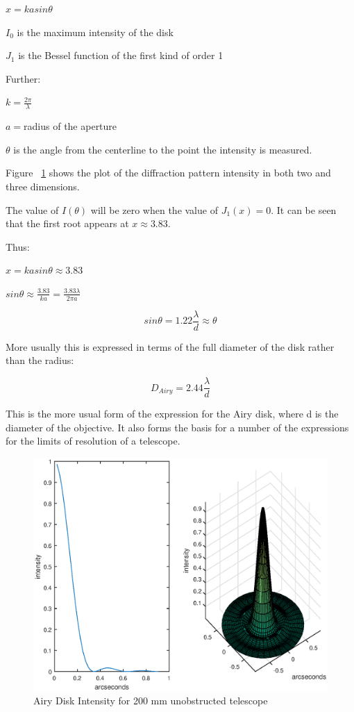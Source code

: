 \documentclass[11pt]{article}
\begin{document}
\Large
$x = kasin\theta$

$I_{0}$ \large is the maximum intensity of the disk 
\Large

$J_{1}$ \large is the Bessel function of the first kind of order 1


Further:

\Large
$k=\frac{2\pi}{\lambda}$

$a=$\large radius of the aperture

$\theta$ is the angle from the centerline to the point the intensity is measured.

Figure ~\ref{fig:airyplots} shows the plot of the diffraction pattern intensity in both two and three dimensions.


The value of $I(\theta)$ will be zero when the value of $J_{1}(x) = 0$.  It can be seen that the first root appears at $x\approx3.83$.

Thus:

\large
$x = kasin\theta \approx 3.83$

$sin\theta\approx\frac{3.83}{ka}=\frac{3.83\lambda}{2\pi a}$

\begin{equation}
\label{eqn:airy-radius}
sin\theta = 1.22\frac{\lambda}{d} \approx \theta 
\end{equation}

More usually this is expressed in terms of the full diameter of the disk rather than the radius:

\begin{equation}
\label{eqn:airy-diameter}
D_{Airy} = 2.44\frac{\lambda}{d}
\end{equation}

\large
This is the more usual form of the expression for the Airy disk, where d is the diameter of the objective.  It also forms the basis for a number of the expressions for the limits of resolution of a telescope.

\begin{figure}[htb]
	\begin{center}
		\includegraphics[scale=0.8]{./images/airy_bessel.eps}
		\caption{Airy Disk Intensity for 200 mm unobstructed telescope}
		\label{fig:airyplots}
	\end{center}
\end{figure}
\newpage
\end{document}
